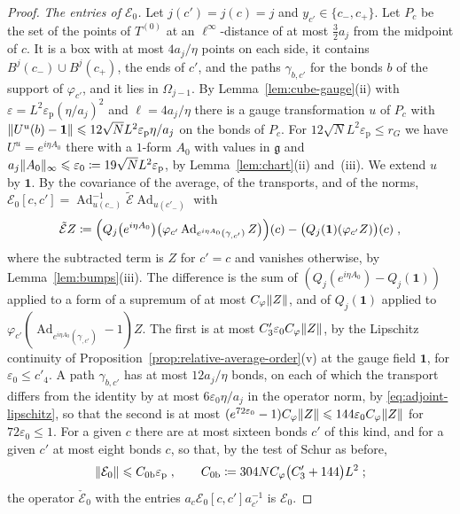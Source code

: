 \documentclass[11pt]{preprint}
\makeatletter
\newcommand{\id}{\mathbf 1}
\newcommand{\Ad}{\operatorname{Ad}}
\DeclarePairedDelimiter{\norm}{\lVert}{\rVert}
\newcommand*{\bigcdot}{}%
\DeclareRobustCommand*{\bigcdot}{%
	\mathbin{\mathpalette\bigcdot@{}}%
}
\newcommand*{\bigcdot@scalefactor}{.7}
\newcommand*{\bigcdot@widthfactor}{1.15}
\newcommand*{\bigcdot@}[2]{%
	\sbox0{$#1\vcenter{}$}%
	\sbox2{$#1\cdot\m@th$}%
	\hbox to \bigcdot@widthfactor\wd2{%
		\hss
		\raise\ht0\hbox{%
			\scalebox{\bigcdot@scalefactor}{%
				\lower\ht0\hbox{$#1\bullet\m@th$}%
			}%
		}%
		\hss
	}%
}
\numberwithin{equation}{section}
\makeatother
\begin{document}
\begin{proof}
\emph{The entries of $\mathcal E_0$.} Let $j(c') = j(c) = j$ and $y_{c'} \in \{ c_-, c_+ \}$. Let $P_c$ be the set of the points of $T^{(0)}$ at an $\ell^\infty$-distance of at most $\frac{3}{2}a_j$ from the midpoint of $c$. It is a box with at most $4a_j/\eta$ points on each side, it contains $B^j(c_-) \cup B^j(c_+)$, the ends of $c'$, and the paths $\gamma_{b,c'}$ for the bonds $b$ of the support of $\varphi_{c'}$, and it lies in $\Omega_{j-1}$. By Lemma~\ref{lem:cube-gauge}(ii) with $\varepsilon = L^2\varepsilon_{\mathrm p}(\eta/a_j)^2$ and $\ell = 4a_j/\eta$ there is a gauge transformation $u$ of $P_c$ with $\norm{U^u(b) - \id} \leqslant 12\sqrt NL^2\varepsilon_{\mathrm p}\eta/a_j$ on the bonds of $P_c$. For $12\sqrt NL^2\varepsilon_{\mathrm p} \leqslant r_G$ we have $U^u = e^{i\eta A_0}$ there with a $1$-form $A_0$ with values in $\mathfrak g$ and $a_j\norm{A_0}_\infty \leqslant \varepsilon_0 \coloneqq 19\sqrt NL^2\varepsilon_{\mathrm p}$, by Lemma~\ref{lem:chart}(ii) and~(iii). We extend $u$ by $\id$. By the covariance of the average, of the transports, and of the norms, $\mathcal E_0[c, c'] = \Ad_{u(c_-)}^{-1}\tilde{\mathcal E}\Ad_{u(c'_-)}$ with
\[
    \tilde{\mathcal E}Z \coloneqq \Bigl(Q_j\bigl(e^{i\eta A_0}\bigr)\bigl(\varphi_{c'}\Ad_{e^{i\eta A_0}(\gamma_{\bigcdot,c'})}Z\bigr)\Bigr)(c) - \bigl(Q_j(\id)(\varphi_{c'}Z)\bigr)(c)\;,
\]
where the subtracted term is $Z$ for $c' = c$ and vanishes otherwise, by Lemma~\ref{lem:bumps}(iii). The difference is the sum of $(Q_j(e^{i\eta A_0}) - Q_j(\id))$ applied to a form of a supremum of at most $C_\varphi\norm Z$, and of $Q_j(\id)$ applied to $\varphi_{c'}(\Ad_{e^{i\eta A_0}(\gamma_{\bigcdot,c'})} - 1)Z$. The first is at most $C'_3\varepsilon_0C_\varphi\norm Z$, by the Lipschitz continuity of Proposition~\ref{prop:relative-average-order}(v) at the gauge field $\id$, for $\varepsilon_0 \leqslant c'_4$. A path $\gamma_{b,c'}$ has at most $12a_j/\eta$ bonds, on each of which the transport differs from the identity by at most $6\varepsilon_0\eta/a_j$ in the operator norm, by \eqref{eq:adjoint-lipschitz}, so that the second is at most $(e^{72\varepsilon_0} - 1)C_\varphi\norm Z \leqslant 144\varepsilon_0C_\varphi\norm Z$ for $72\varepsilon_0 \leqslant 1$. For a given $c$ there are at most sixteen bonds $c'$ of this kind, and for a given $c'$ at most eight bonds $c$, so that, by the test of Schur as before,
\[
    \norm{\mathcal E_0} \leqslant C_{0\mathrm b}\varepsilon_{\mathrm p}\;,
    \qquad
    C_{0\mathrm b} \coloneqq 304NC_\varphi\bigl(C'_3 + 144\bigr)L^2\;;
\]
the operator $\check{\mathcal E}_0$ with the entries $a_c\mathcal E_0[c, c']a_{c'}^{-1}$ is $\mathcal E_0$.


\end{proof}
\end{document}
